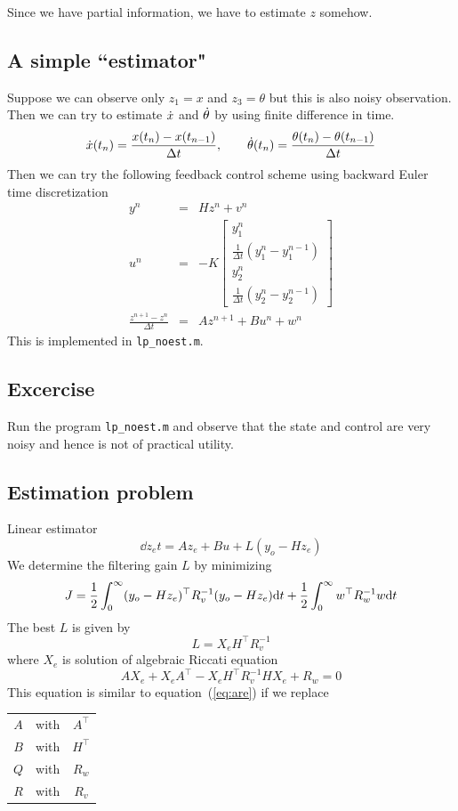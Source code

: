 \documentclass[12pt]{article}
\begin{document}
Since we have partial information, we have to estimate $z$ somehow.
\subsection{A simple ``estimator"}
Suppose we can observe only $z_1 = x$ and $z_3 = \theta$ but this is also noisy observation. Then we can try to estimate $\dot{x}$ and $\dot{\theta}$ by using finite difference in time.
\[
\dot{x}(t_n) = \frac{x(t_n) - x(t_{n-1})}{\Delta t}, \qquad \dot{\theta}(t_n) = \frac{\theta(t_n) - \theta(t_{n-1})}{\Delta t}
\]
Then we can try the following feedback control scheme using backward Euler time discretization
\begin{eqnarray*}
y^n &=& H z^n + v^n \\
u^n &=& - K \begin{bmatrix}
y_1^n \\
\frac{1}{\Delta t}(y_1^n - y_1^{n-1}) \\
y_2^n \\
\frac{1}{\Delta t}(y_2^n - y_2^{n-1})
\end{bmatrix} \\
\frac{z^{n+1} - z^n}{\Delta t} &=& A z^{n+1} + B u^n + w^n
\end{eqnarray*}
This is implemented in {\tt lp\_noest.m}.
\subsection{Excercise}
Run the program {\tt lp\_noest.m} and observe that the state and control are very noisy and hence is not of practical utility.
\subsection{Estimation problem}
Linear estimator
\[
\dd{z_e}{t} = A z_e + Bu + L(y_o - H z_e)
\]
We determine the filtering gain $L$ by minimizing
\[
J = \frac{1}{2} \int_0^\infty (y_o - H z_e)^\top R_v^{-1} (y_o - H z_e) \textrm{d} t +            \frac{1}{2} \int_0^\infty w^\top R_w^{-1} w \textrm{d} t
\]
The best $L$ is given by
\begin{equation}
L = X_e H^\top R_v^{-1}
\label{eq:L}
\end{equation}
where $X_e$ is solution of algebraic Riccati equation
\[
A X_e + X_e A^\top - X_e H^\top R_v^{-1}  H X_e + R_w = 0
\]
This equation is similar to equation~(\ref{eq:are}) if we replace 
\begin{center}
\begin{tabular}{ccc}
$A$ & with & $A^\top$ \\
$B$ & with & $H^\top$ \\
$Q$ & with & $R_w$ \\
$R$ & with & $R_v$
\end{tabular}
\end{center}
\end{document}
